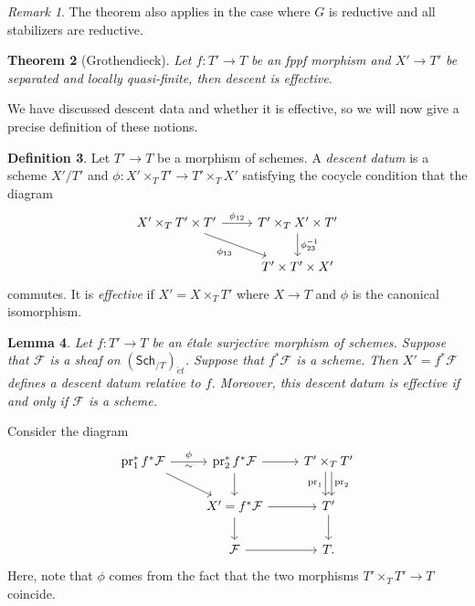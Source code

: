 \documentclass{amsart}
\newtheorem{thm}{Theorem}[section]
\newtheorem{lem}[thm]{Lemma}
\theoremstyle{definition}
\newtheorem{defn}[thm]{Definition}
\theoremstyle{remark}
\newtheorem{rmk}[thm]{Remark}
\theoremstyle{plain}
\theoremstyle{definition}
\theoremstyle{remark}
\newcommand{\mc}[1]{\mathcal{#1}}
\newcommand{\on}[1]{\operatorname{#1}}
\newcommand{\ms}[1]{\mathsf{#1}}
\newcommand{\1}{\mathbf{1}}
\newcommand{\2}{\mathbf{2}}
\newcommand{\3}{\mathbf{3}}
\begin{document}
\begin{rmk}
    The theorem also applies in the case where \(G\) is reductive and all stabilizers are reductive.
\end{rmk}

\begin{thm}[Grothendieck]
    Let \(f \colon T' \to T\) be an fppf morphism and \(X' \to T'\) be separated and locally quasi-finite, then descent is effective.
\end{thm}

We have discussed descent data and whether it is effective, so we will now give a precise definition of these notions.

\begin{defn}
    Let \(T' \to T\) be a morphism of schemes. A \textit{descent datum} is a scheme \(X'/T'\) and \(\phi \colon X' \times_T T' \to T' \times_T X'\) satisfying the cocycle condition that the diagram
    \begin{equation*}
    \begin{tikzcd}
        X' \times_T T' \times T' \ar{r}{\phi_{12}} \ar{dr}[swap]{\phi_{13}} & T' \times_T X' \times T' \ar{d}{\phi_{23}^{-1}} \\
        & T' \times T' \times X'
    \end{tikzcd}
    \end{equation*}
    commutes. It is \textit{effective} if \(X' = X \times_T T'\) where \(X \to T\) and \(\phi\) is the canonical isomorphism.
\end{defn}

\begin{lem}
    Let \(f \colon T' \to T\) be an \'etale surjective morphism of schemes. Suppose that \(\mc{F}\) is a sheaf on \((\ms{Sch}_{/T})_{\acute{e}t}\). Suppose that \(f^* \mc{F}\) is a scheme. Then \(X' = f^* \mc{F}\) defines a descent datum relative to \(f\). Moreover, this descent datum is effective if and only if \(\mc{F}\) is a scheme.
\end{lem}


Consider the diagram
\begin{equation*}
\begin{tikzcd}
   \on{pr}_1^* f^* \mc{F} \ar{r}{\phi}[swap]{\sim} \ar{dr} & \on{pr}_2^*f^* \mc{F} \ar{r} \ar{d} & T' \times_T T' \ar[shift left]{d}{\on{pr}_2}\ar[shift right]{d}[swap]{\on{pr}_1} \\
    & X' = f^* \mc{F} \ar{r} \ar{d} & T' \ar{d} \\
    & \mc{F} \ar{r} & T.
\end{tikzcd}
\end{equation*}
Here, note that \(\phi\) comes from the fact that the two morphisms \(T' \times_T T' \to T\) coincide.
\end{document}
